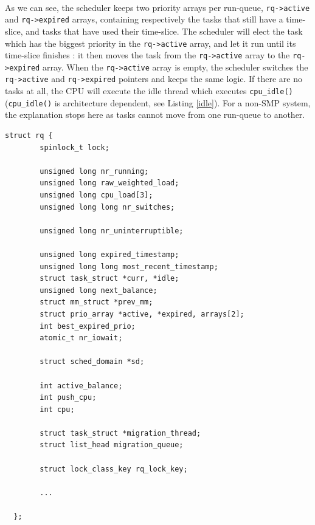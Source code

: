 \documentclass{report}
\renewcommand{\tt}[1]{\texttt{{{#1}}}}
\begin{document}
\paragraph{}
As we can see, the scheduler keeps two priority arrays per run-queue,
\tt{rq->active} and \tt{rq->expired} arrays, containing respectively the tasks
that still have a time-slice, and tasks that have used their time-slice. The
scheduler will elect the task which has the biggest priority in the
\tt{rq->active} array, and let it run until its time-slice finishes : it then
moves the task from the \tt{rq->active} array to the \tt{rq->expired}
array. When the \tt{rq->active} array is empty, the scheduler switches the
\tt{rq->active} and \tt{rq->expired} pointers and keeps the same logic. If
there are no tasks at all, the CPU will execute the idle thread which executes
\tt{cpu\_idle()} (\tt{cpu\_idle()} is architecture dependent, see Listing
\ref{idle}). For a non-SMP system, the explanation stops here as tasks cannot
move from one run-queue to another.

\lstset { language=C, numbers=none, numberstyle=\tiny, tabsize=8, basicstyle = \tiny }

\begin{lstlisting}[float,caption=The runqueue structure{{,}} \tt{kernel/sched.c},label=rq]
  struct rq {
        spinlock_t lock;

        unsigned long nr_running;
        unsigned long raw_weighted_load;
        unsigned long cpu_load[3];
        unsigned long long nr_switches;

        unsigned long nr_uninterruptible;

        unsigned long expired_timestamp;
        unsigned long long most_recent_timestamp;
        struct task_struct *curr, *idle;
        unsigned long next_balance;
        struct mm_struct *prev_mm;
        struct prio_array *active, *expired, arrays[2];
        int best_expired_prio;
        atomic_t nr_iowait;

        struct sched_domain *sd;

        int active_balance;
        int push_cpu;
        int cpu;

        struct task_struct *migration_thread;
        struct list_head migration_queue;

        struct lock_class_key rq_lock_key;

        ...

  };
\end{lstlisting}
\end{document}
